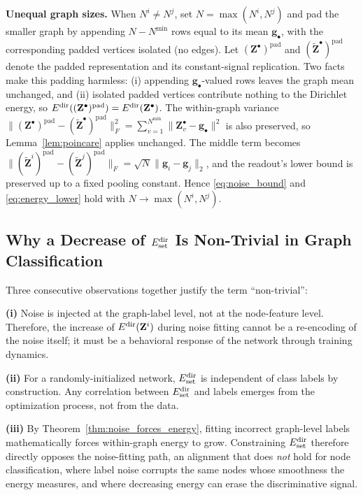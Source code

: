 \textbf{Unequal graph sizes.} When $N^i\neq N^j$, set $N=\max(N^i,N^j)$ and pad the smaller graph by appending $N-N^{\min}$ rows equal to its mean $\mathbf{g}_\bullet$, with the corresponding padded vertices isolated (no edges). Let $(\mathbf{Z}^\bullet)^{\text{pad}}$ and $(\widetilde{\mathbf{Z}}^\bullet)^{\text{pad}}$ denote the padded representation and its constant-signal replication. Two facts make this padding harmless: (i) appending $\mathbf{g}_\bullet$-valued rows leaves the graph mean unchanged, and (ii) isolated padded vertices contribute nothing to the Dirichlet energy, so $E^{\text{dir}}((\mathbf{Z}^\bullet)^{\text{pad}})=E^{\text{dir}}(\mathbf{Z}^\bullet)$. The within-graph variance $\|(\mathbf{Z}^\bullet)^{\text{pad}}-(\widetilde{\mathbf{Z}}^\bullet)^{\text{pad}}\|_F^2=\sum_{v=1}^{N^{\min}}\|\mathbf{Z}^\bullet_v-\mathbf{g}_\bullet\|^2$ is also preserved, so Lemma~\ref{lem:poincare} applies unchanged. The middle term becomes $\|(\widetilde{\mathbf{Z}}^i)^{\text{pad}}-(\widetilde{\mathbf{Z}}^j)^{\text{pad}}\|_F=\sqrt{N}\|\mathbf{g}_i-\mathbf{g}_j\|_2$, and the readout's lower bound is preserved up to a fixed pooling constant. Hence \eqref{eq:noise_bound} and \eqref{eq:energy_lower} hold with $N\to\max(N^i,N^j)$.

\subsection{Why a Decrease of $E^{\text{dir}}_{\text{set}}$ Is Non-Trivial in Graph Classification}

Three consecutive observations together justify the term ``non-trivial'':

\textbf{(i)} Noise is injected at the graph-label level, not at the node-feature level. Therefore, the increase of $E^{\text{dir}}(\mathbf{Z}^i)$ during noise fitting cannot be a re-encoding of the noise itself; it must be a behavioral response of the network through training dynamics.

\textbf{(ii)} For a randomly-initialized network, $E^{\text{dir}}_{\text{set}}$ is independent of class labels by construction. Any correlation between $E^{\text{dir}}_{\text{set}}$ and labels emerges from the optimization process, not from the data.

\textbf{(iii)} By Theorem~\ref{thm:noise_forces_energy}, fitting incorrect graph-level labels mathematically forces within-graph energy to grow. Constraining $E^{\text{dir}}_{\text{set}}$ therefore directly opposes the noise-fitting path, an alignment that does \emph{not} hold for node classification, where label noise corrupts the same nodes whose smoothness the energy measures, and where decreasing energy can erase the discriminative signal.

